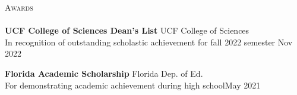 \documentclass[letterpaper]{article}
\newcommand{\lineunder} {
    \vspace*{-8pt} \\
    \hspace*{-18pt} \hrulefill \\
}
\newcommand{\header} [1] {
    {\hspace*{-18pt}\vspace*{12pt} \large\textsc{#1}}
    \vspace*{-12pt} \lineunder
}
\begin{document}
\vspace{2mm}

\header{Awards}

\textbf{UCF College of Sciences Dean's List} \hfill UCF College of Sciences\\
In recognition of outstanding scholastic achievement for fall 2022 semester \hfill Nov 2022\\
\vspace*{2mm}

\textbf{Florida Academic Scholarship} \hfill Florida Dep. of Ed.\\
For demonstrating academic achievement during high school\hfill May 2021\\
\end{document}
